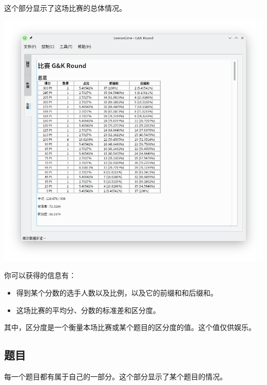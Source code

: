 \documentclass[UTF-8]{ctexart}
\begin{document}
			这个部分显示了这场比赛的总体情况。
		
			\begin{center}
			\includegraphics[scale=0.5]{pics/statistics.png}
			\end{center}
		
			你可以获得的信息有：
			
			\begin{itemize}
				\item 得到某个分数的选手人数以及比例，以及它的前缀和和后缀和。
				\item 这场比赛的平均分、分数的标准差和区分度。
			\end{itemize}
		
			其中，区分度是一个衡量本场比赛或某个题目的区分度的值。这个值仅供娱乐。
			
		
		\subsection{题目}
		
			每一个题目都有属于自己的一部分。这个部分显示了某个题目的情况。
			
\end{document}
